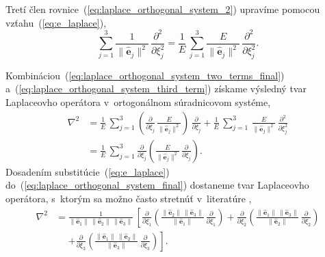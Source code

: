 \documentclass[a4paper, 12pt]{book}
\let\vec\mathbf
\begin{document}
Tretí člen rovnice~(\ref{eq:laplace_orthogonal_system_2}) upravíme pomocou 
vzťahu~(\ref{eq:e_laplace}),
%
\begin{equation}
\label{eq:laplace_orthogonal_system_third_term}
\sum_{j = 1}^3 \frac{1}{\| \hat{\vec e}_j \|^2} \, \frac{\partial^2}{\partial 
\xi_j^2} = \frac{1}{E} \, \sum_{j = 1}^3 \frac{E}{\| \hat{\vec e}_j \|^2} \, 
\frac{\partial^2}{\partial \xi_j^2}{.}
\end{equation}

Kombináciou~(\ref{eq:laplace_orthogonal_system_two_terms_final}) 
a~(\ref{eq:laplace_orthogonal_system_third_term}) získame výsledný tvar 
Laplaceovho operátora v~ortogonálnom súradnicovom systéme,
%
\begin{equation}
\label{eq:laplace_orthogonal_system_final}
\begin{split}
\nabla^2 &= \frac{1}{E} \, \sum_{j = 1}^3 \left( \frac{\partial}{\partial 
\xi_j} \, \frac{E}{\| \hat{\vec e}_j \|^2}\right) \, \frac{\partial}{\partial 
\xi_j} + \frac{1}{E} \, \sum_{j = 1}^3 \, \frac{E}{\| \hat{\vec e}_j \|^2} \, 
\frac{\partial^2}{\partial \xi_j^2}\\
%
&= \frac{1}{E} \, \sum_{j = 1}^3 \frac{\partial}{\partial \xi_j} \left( 
\frac{E}{\| \hat{\vec e}_j  \|^2} \, \frac{\partial}{\partial \xi_j} \right){.}
\end{split}
\end{equation}
%
Dosadením substitúcie~(\ref{eq:e_laplace}) 
do~(\ref{eq:laplace_orthogonal_system_final}) dostaneme tvar Laplaceovho 
operátora, s~ktorým sa možno často stretnúť v~literatúre 
\parencite[napríklad][]{MoritzPhysicalGeodesy},
%
\begin{equation}
\label{eq:laplace_orthogonal_system_final_2}
\begin{split}
\nabla^2 &= \frac{1}{\| \hat{\vec e}_1 \| \, \| \hat{\vec e}_2 \| \, \| 
\hat{\vec e}_3 \|} \, \left[ \frac{\partial}{\partial \xi_1} \left( \frac{\| 
\hat{\vec e}_2 \| \, \| \hat{\vec e}_3 \|}{\| \hat{\vec e}_1 \|} \, 
\frac{\partial}{\partial \xi_1} \right) + \frac{\partial}{\partial \xi_2} 
\left( \frac{\| \hat{\vec e}_1 \| \, \| \hat{\vec e}_3 \|}{\| \hat{\vec e}_2 
\|} \, \frac{\partial}{\partial \xi_2} \right) \right.\\
%
&\phantom{={}}\left. + \frac{\partial}{\partial \xi_3} \left( \frac{\| 
\hat{\vec e}_1 \| \, \| \hat{\vec e}_2 \|}{\| \hat{\vec e}_3 \|} \, 
\frac{\partial}{\partial \xi_3} \right)\right]{.}
\end{split}
\end{equation}
\end{document}
